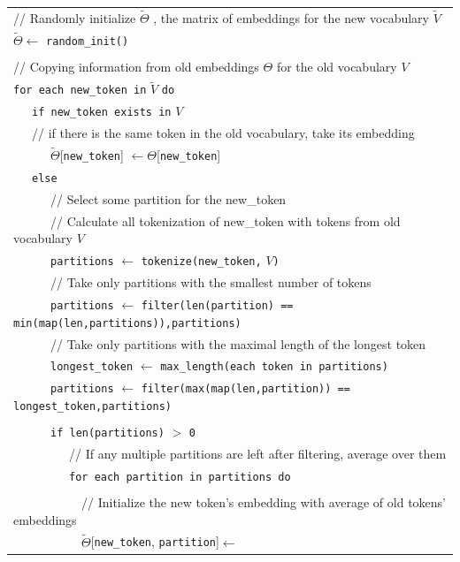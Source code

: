 \documentclass[review]{elsarticle}
\begin{document}
\begin{table}[h!]
\centering
\small{\begin{tabular}{l}
 \hline
 // Randomly initialize $\widetilde{\Theta}$ , the matrix of embeddings for the new vocabulary $\widetilde{V}$\\
$\widetilde{\Theta} \leftarrow $ \verb"random_init()"\\
\\
// Copying information from old embeddings $\Theta$ for the old vocabulary $V$\\
\verb"for each new_token in" $\widetilde{V}$ \verb"do"\\
~~~\verb"if new_token exists in" $V$\\
~~~// if there is the same token in the old vocabulary, take its embedding\\
~~~~~~$\widetilde{\Theta}$[\verb"new_token"] $\leftarrow \Theta$[\verb"new_token"]\\
~~~\verb"else"\\
~~~~~~// Select some partition for the new\_token\\
~~~~~~// Calculate all tokenization of new\_token with tokens from old vocabulary $V$\\
~~~~~~\verb"partitions" $\leftarrow$ \verb"tokenize(new_token," $V$\verb")"\\
~~~~~~// Take only partitions with the smallest number of tokens\\
~~~~~~\verb"partitions" $\leftarrow$ \verb"filter(len(partition) == min(map(len,partitions)),partitions)"\\
~~~~~~// Take only partitions with the maximal length of the longest token\\
~~~~~~\verb"longest_token" $\leftarrow$ \verb"max_length(each token in partitions)"\\
~~~~~~\verb"partitions" $\leftarrow$ \verb"filter(max(map(len,partition)) == longest_token,partitions)"\\
\\
~~~~~~\verb"if len(partitions)" $>$ \verb"0"\\
~~~~~~~~~// If any multiple partitions are left after filtering, average over them\\
~~~~~~~~~\verb"for each partition in partitions do"\\
\\
~~~~~~~~~~~// Initialize the new token's embedding with average of old tokens' embeddings\\
~~~~~~~~~~~$\widetilde{\Theta}$[\verb"new_token", \verb"partition"]$\leftarrow$ \\

\end{tabular}}
\end{table}
\end{document}
